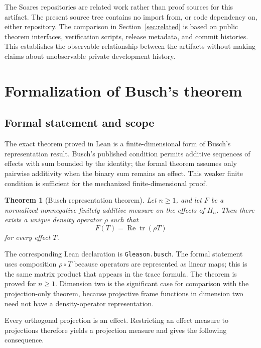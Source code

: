 \documentclass[pdflatex,sn-mathphys-num]{sn-jnl}
\providecommand{\passthrough}[1]{#1}
\theoremstyle{thmstyleone}
\newtheorem{theorem}{Theorem}
\theoremstyle{thmstylethree}
\begin{document}
The Soares repositories are related work rather than proof sources for this artifact. The present source tree contains no import from, or code dependency on, either repository. The comparison in Section~\ref{sec:related} is based on public theorem interfaces, verification scripts, release metadata, and commit histories. This establishes the observable relationship between the artifacts without making claims about unobservable private development history.

\section{Formalization of Busch's theorem}\label{sec:busch}

\subsection{Formal statement and scope}\label{formal-statement-and-scope}

The exact theorem proved in Lean is a finite-dimensional form of Busch's representation result. Busch's published condition permits additive sequences of effects with sum bounded by the identity; the formal theorem assumes only pairwise additivity when the binary sum remains an effect. This weaker finite condition is sufficient for the mechanized finite-dimensional proof.

\begin{theorem}[Busch representation theorem]\label{thm:busch}
Let \(n\geq 1\), and let \(F\) be a normalized nonnegative finitely additive measure on the effects of \(H_n\). Then there exists a unique density operator \(\rho\) such that
\[
F(T)=\operatorname{Re}\operatorname{tr}(\rho T)
\]
for every effect \(T\).
\end{theorem}

The corresponding Lean declaration is \passthrough{\lstinline!Gleason.busch!}. The formal statement uses composition \(\rho\circ T\) because operators are represented as linear maps; this is the same matrix product that appears in the trace formula. The theorem is proved for \(n\geq1\). Dimension two is the significant case for comparison with the projection-only theorem, because projective frame functions in dimension two need not have a density-operator representation.

Every orthogonal projection is an effect. Restricting an effect measure to projections therefore yields a projection measure and gives the following consequence.
\end{document}
